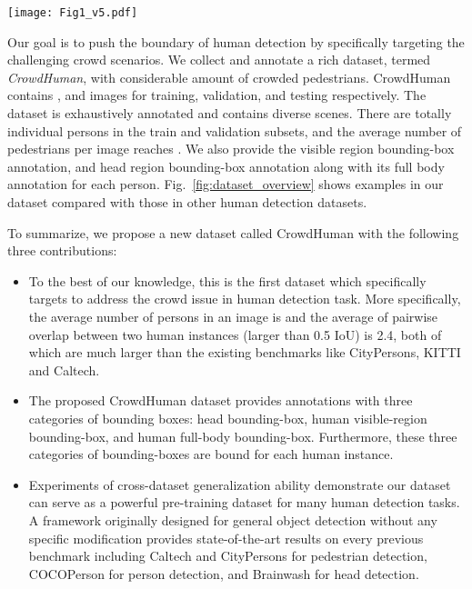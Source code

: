 \documentclass[10pt,twocolumn,letterpaper]{article}
\begin{document}
\begin{figure*}[thp]
\centering
\texttt{[image: Fig1\_v5.pdf]}
\caption{Illustrative examples from different human dataset benchmarks. The images inside the green, yellow, blue boxes are from the COCO~\cite{lin2014microsoft}, Caltech~\cite{dollar2009pedestrian}, and CityPersons~\cite{zhang2017citypersons} datasets, respectively. The images from the second row inside the red box are from our CrowdHuman benchmark with full body, visible body, and head bounding box annotations for each person.}
\label{fig:dataset_overview}
\end{figure*}


Our goal is to push the boundary of human detection by specifically targeting the challenging crowd scenarios. We collect and annotate a rich dataset,  termed \emph{CrowdHuman}, with considerable amount of crowded pedestrians. CrowdHuman contains ,  and  images for training, validation, and testing respectively. The dataset is exhaustively annotated and contains diverse scenes. There are totally  individual persons in the train and validation subsets, and the average number of pedestrians per image reaches . We also provide the visible region bounding-box annotation, and head region bounding-box annotation along with its full body annotation for each person. Fig.~\ref{fig:dataset_overview} shows examples in our dataset compared with those in other human detection datasets.




To summarize, we propose a new dataset called CrowdHuman with the following three contributions:
\begin{itemize}
    \item To the best of our knowledge, this is the first dataset which specifically targets to address the crowd issue in human detection task. More specifically, the average number of persons in an image is  and the average of pairwise overlap between two human instances (larger than 0.5 IoU) is 2.4, both of which are much larger than the existing benchmarks like CityPersons, KITTI and Caltech. 
    \item The proposed CrowdHuman dataset provides annotations with three categories of bounding boxes: head bounding-box, human visible-region bounding-box, and human full-body bounding-box. Furthermore, these three categories of bounding-boxes are bound for each human instance.
    \item Experiments of cross-dataset generalization ability demonstrate our dataset can serve as a powerful pre-training dataset for many human detection tasks. A framework originally designed for general object detection without any specific modification provides state-of-the-art results on every previous benchmark including Caltech and CityPersons for pedestrian detection, COCOPerson for person detection, and Brainwash for head detection.
\end{itemize}
\end{document}

